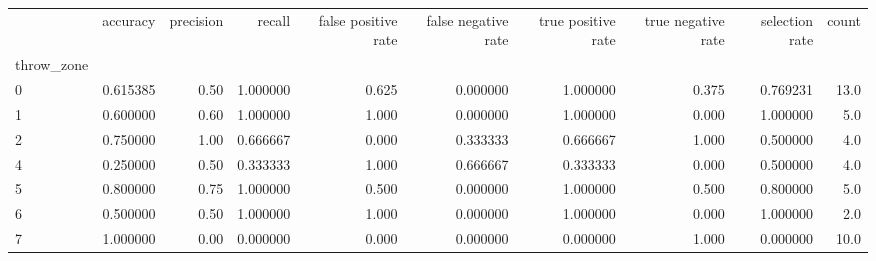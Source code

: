 \begin{tabular}{lrrrrrrrrr}
\toprule
{} &  accuracy &  precision &    recall &  false positive rate &  false negative rate &  true positive rate &  true negative rate &  selection rate &  count \\
throw\_zone &           &            &           &                      &                      &                     &                     &                 &        \\
\midrule
0          &  0.615385 &       0.50 &  1.000000 &                0.625 &             0.000000 &            1.000000 &               0.375 &        0.769231 &   13.0 \\
1          &  0.600000 &       0.60 &  1.000000 &                1.000 &             0.000000 &            1.000000 &               0.000 &        1.000000 &    5.0 \\
2          &  0.750000 &       1.00 &  0.666667 &                0.000 &             0.333333 &            0.666667 &               1.000 &        0.500000 &    4.0 \\
4          &  0.250000 &       0.50 &  0.333333 &                1.000 &             0.666667 &            0.333333 &               0.000 &        0.500000 &    4.0 \\
5          &  0.800000 &       0.75 &  1.000000 &                0.500 &             0.000000 &            1.000000 &               0.500 &        0.800000 &    5.0 \\
6          &  0.500000 &       0.50 &  1.000000 &                1.000 &             0.000000 &            1.000000 &               0.000 &        1.000000 &    2.0 \\
7          &  1.000000 &       0.00 &  0.000000 &                0.000 &             0.000000 &            0.000000 &               1.000 &        0.000000 &   10.0 \\
\bottomrule
\end{tabular}
